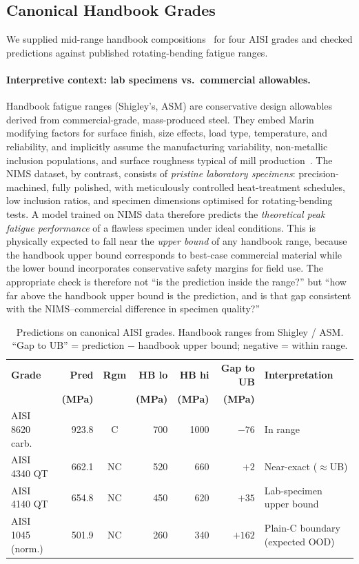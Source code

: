 \documentclass[12pt,a4paper]{article} %
\begin{document}
\subsection{Canonical Handbook Grades}
We supplied mid-range handbook compositions~\cite{shigley} for four AISI grades and checked predictions against published rotating-bending fatigue ranges.

\paragraph{Interpretive context: lab specimens vs.\ commercial allowables.}
Handbook fatigue ranges (Shigley's, ASM) are conservative design allowables derived from
commercial-grade, mass-produced steel. They embed Marin modifying factors for surface
finish, size effects, load type, temperature, and reliability, and implicitly assume the
manufacturing variability, non-metallic inclusion populations, and surface roughness
typical of mill production~\cite{shigley}. The NIMS dataset, by contrast, consists of
\emph{pristine laboratory specimens}: precision-machined, fully polished, with
meticulously controlled heat-treatment schedules, low inclusion ratios, and specimen
dimensions optimised for rotating-bending tests. A model trained on NIMS data therefore
predicts the \emph{theoretical peak fatigue performance} of a flawless specimen under
ideal conditions. This is physically expected to fall near the \emph{upper bound} of any
handbook range, because the handbook upper bound corresponds to best-case commercial
material while the lower bound incorporates conservative safety margins for field use.
The appropriate check is therefore not ``is the prediction inside the range?'' but
``how far above the handbook upper bound is the prediction, and is that gap consistent
with the NIMS--commercial difference in specimen quality?''

\begin{table}[H]
\centering
\caption{Predictions on canonical AISI grades. Handbook ranges from Shigley / ASM.
``Gap to UB'' = prediction $-$ handbook upper bound; negative = within range.}
\label{tab:grades}
{\small\setlength{\tabcolsep}{4pt}
\begin{tabular}{lrcrrrp{3.8cm}}
\toprule
\textbf{Grade} & \textbf{Pred} & \textbf{Rgm} & \textbf{HB lo} & \textbf{HB hi} & \textbf{Gap to UB} & \textbf{Interpretation} \\
 & \textbf{(MPa)} & & \textbf{(MPa)} & \textbf{(MPa)} & \textbf{(MPa)} & \\
\midrule
AISI 8620 carb.   & 923.8 & C  & 700 & 1000 & $-76$  & In range \\
AISI 4340 QT      & 662.1 & NC & 520 & 660  & $+2$   & Near-exact ($\approx$UB) \\
AISI 4140 QT      & 654.8 & NC & 450 & 620  & $+35$  & Lab-specimen upper bound \\
AISI 1045 (norm.) & 501.9 & NC & 260 & 340  & $+162$ & Plain-C boundary (expected OOD) \\
\bottomrule
\end{tabular}}
\end{table}
\end{document}
